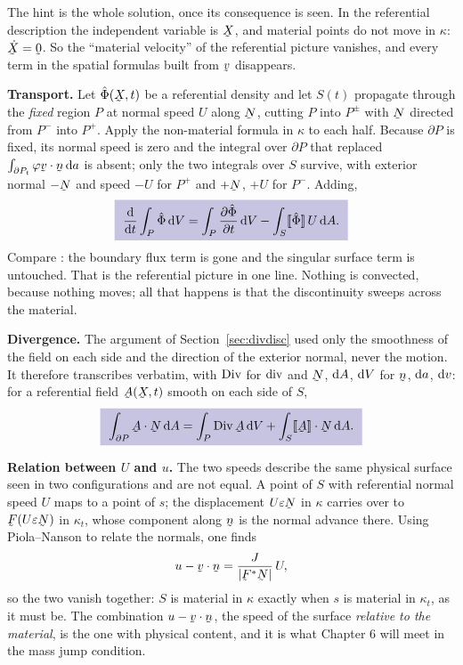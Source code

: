 \begin{solution}
The hint is the whole solution, once its consequence is seen. In the
referential description the independent variable is $\bX$, and material
points do not move in $\kappa$: $\dot\bX=\bze$. So the ``material
velocity'' of the referential picture vanishes, and every term in the
spatial formulas built from $\bv$ disappears.

\textbf{Transport.} Let $\hat\Phi(\bX,t)$ be a referential density and let
$S(t)$ propagate through the \emph{fixed} region $P$ at normal speed $U$
along $\bN$, cutting $P$ into $P^{\pm}$ with $\bN$ directed from $P^{-}$
into $P^{+}$. Apply the non-material formula  in $\kappa$ to
each half. Because $\partial P$ is fixed, its normal speed is zero and the
integral over $\partial P$ that replaced $\int_{\partial P_{t}}\varphi
\ip\bv\bn\,\dl a$ is absent; only the two integrals over $S$ survive, with
exterior normal $-\bN$ and speed $-U$ for $P^{+}$ and $+\bN$, $+U$ for
$P^{-}$. Adding,
\[
   \boxed{\ \frac{\dl}{\dl t}\int_{P}\hat\Phi\,\dl V
   =\int_{P}\frac{\partial\hat\Phi}{\partial t}\,\dl V
   -\int_{S}\jump{\hat\Phi}\,U\,\dl A .\ }
\]
Compare : the boundary flux term is gone and the singular
surface term is untouched. That is the referential picture in one
line. Nothing is convected, because nothing moves; all that happens is that the
discontinuity sweeps across the material.

\textbf{Divergence.} The argument of Section~\ref{sec:divdisc} used only
the smoothness of the field on each side and the direction of the
exterior normal, never the motion. It therefore transcribes verbatim, with
$\operatorname{Div}$ for $\operatorname{div}$ and $\bN$, $\mathrm{d} A$, $\mathrm{d} V$ for $\bn$, $\mathrm{d} a$, $\mathrm{d} v$:
for a referential field $\bA(\bX,t)$ smooth on each side of $S$,
\[
   \boxed{\ \int_{\partial P}\ip\bA\bN\,\dl A
   =\int_{P}\Dvg\bA\,\dl V+\int_{S}\ip{\jump\bA}\bN\,\dl A .\ }
\]

\textbf{Relation between $U$ and $u$.} The two speeds describe the same
physical surface seen in two configurations and are not equal. A point of
$S$ with referential normal speed $U$ maps to a point of $s$; the
displacement $U\eps\bN$ in $\kappa$ carries over to $\bF(U\eps\bN)$ in
$\kappa_{t}$, whose component along $\bn$ is the normal advance there.
Using Piola--Nanson to relate the normals, one finds
\[
   u-\ip\bv\bn=\frac{J}{|\bF^{*}\bN|}\,U ,
\]
so the two vanish together: $S$ is material in $\kappa$ exactly when $s$
is material in $\kappa_{t}$, as it must be. The combination
$u-\ip\bv\bn$, the speed of the surface \emph{relative to the material},
is the one with physical content, and it is what Chapter 6 will meet in
the mass jump condition.
\end{solution}
